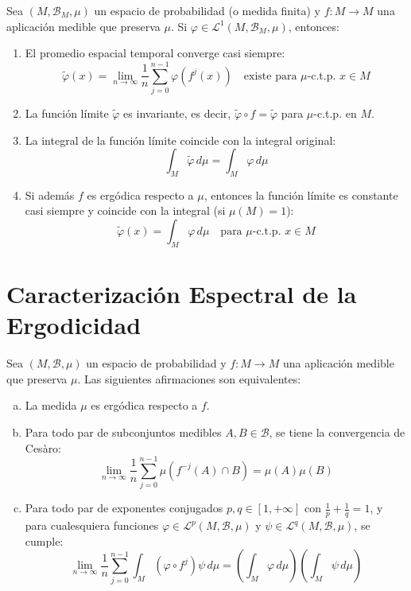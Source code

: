 \begin{teorema}
	Sea $(M, \mathcal{B}_M, \mu)$ un espacio de probabilidad (o medida finita) y $f: M \to M$ una aplicación medible que preserva $\mu$. Si $\varphi \in \mathcal{L}^1(M, \mathcal{B}_M, \mu)$, entonces:
	\begin{enumerate}[1)]
		\item El promedio espacial temporal converge casi siempre:
		$$ \tilde{\varphi}(x) = \lim_{n \to \infty} \frac{1}{n} \sum_{j=0}^{n-1} \varphi(f^j(x)) \quad \text{existe para } \mu\text{-c.t.p. } x \in M $$
		\item La función límite $\tilde{\varphi}$ es invariante, es decir, $\tilde{\varphi} \circ f = \tilde{\varphi}$ para $\mu$-c.t.p. en $M$.
		\item La integral de la función límite coincide con la integral original:
		$$ \int_M \tilde{\varphi} \, d\mu = \int_M \varphi \, d\mu $$
		\item Si además $f$ es ergódica respecto a $\mu$, entonces la función límite es constante casi siempre y coincide con la integral (si $\mu(M)=1$):
		$$ \tilde{\varphi}(x) = \int_M \varphi \, d\mu \quad \text{para } \mu\text{-c.t.p. } x \in M $$
	\end{enumerate}
\end{teorema}

\section{Caracterización Espectral de la Ergodicidad}

\begin{teorema}
	Sea $(M, \mathcal{B}, \mu)$ un espacio de probabilidad y $f: M \to M$ una aplicación medible que preserva $\mu$. Las siguientes afirmaciones son equivalentes:
	\begin{enumerate}[a)]
		\item La medida $\mu$ es ergódica respecto a $f$.
		\item Para todo par de subconjuntos medibles $A, B \in \mathcal{B}$, se tiene la convergencia de Cesàro:
		$$ \lim_{n \to \infty} \frac{1}{n} \sum_{j=0}^{n-1} \mu(f^{-j}(A) \cap B) = \mu(A)\mu(B) $$
		\item Para todo par de exponentes conjugados $p, q \in [1, +\infty]$ con $\frac{1}{p} + \frac{1}{q} = 1$, y para cualesquiera funciones $\varphi \in \mathcal{L}^p(M, \mathcal{B}, \mu)$ y $\psi \in \mathcal{L}^q(M, \mathcal{B}, \mu)$, se cumple:
		$$ \lim_{n \to \infty} \frac{1}{n} \sum_{j=0}^{n-1} \int_M (\varphi \circ f^j)\psi \, d\mu = \left( \int_M \varphi \, d\mu \right) \left( \int_M \psi \, d\mu \right) $$
	\end{enumerate}
\end{teorema}

